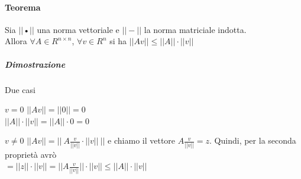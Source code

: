 \documentclass[10pt]{book}
\begin{document}
\paragraph{Teorema} Sia $||$•$||$ una norma vettoriale e $||-||$ la norma matriciale indotta.\\
Allora $\forall A \in R^{n \times n}$, $\forall v \in R^n$ si ha $||Av|| \leq ||A||\cdot||v||$
\subparagraph{Dimostrazione} Due casi
\begin{list}{}{}
	\item[$v = 0$] $||Av|| = ||0|| = 0$\\
	$||A||\cdot||v|| = ||A||\cdot 0 = 0$
	\item[$v \neq 0$] $||Av|| = ||\:A\frac{v}{||v||}\cdot||v||\:||$ e chiamo il vettore $A\frac{v}{||v||} = z$. Quindi, per la seconda proprietà avrò\\
	$= ||z||\cdot||v|| = ||A\frac{v}{||v||}||\cdot||v|| \leq ||A||\cdot||v||$
\end{list}
\end{document}
